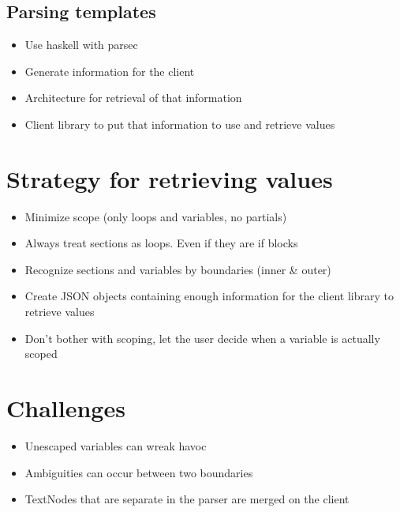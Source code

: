 \subsection{Parsing templates}

\begin{itemize}
\item Use haskell with parsec
\item Generate information for the client
\item Architecture for retrieval of that information
\item Client library to put that information to use and retrieve values
\end{itemize}

\section{Strategy for retrieving values}
\begin{itemize}
\item Minimize scope (only loops and variables, no partials)
\item Always treat sections as loops. Even if they are if blocks
\item Recognize sections and variables by boundaries (inner \& outer)
\item Create JSON objects containing enough information for the client library to retrieve values
\item Don't bother with scoping, let the user decide when a variable is actually scoped
\end{itemize}

\section{Challenges}
\begin{itemize}
\item Unescaped variables can wreak havoc
\item Ambiguities can occur between two boundaries
\item TextNodes that are separate in the parser are merged on the client
\end{itemize}
